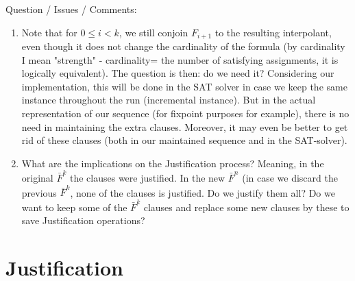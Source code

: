 \documentclass{article}
\begin{document}
Question / Issues / Comments:
\begin{enumerate}
	\item Note that for $0\leq i < k$, we still conjoin $F_{i+1}$ to the resulting interpolant, even though it does not change the cardinality of the formula (by cardinality I mean "strength" - cardinality= the number of satisfying assignments, it is logically equivalent). The question is then: do we need it? Considering our implementation, this will be done in the SAT solver in case we keep the same instance throughout the run (incremental instance). But in the actual representation of our sequence (for fixpoint purposes for example), there is no need in maintaining the extra clauses. Moreover, it may even be better to get rid of these clauses (both in our maintained sequence and in the SAT-solver).

	\item What are the implications on the Justification process? Meaning, in the original $\bar{F}^k$ the clauses were justified. In the new $\bar{F}^n$ (in case we discard the previous $\bar{F}^k$, none of the clauses is justified. Do we justify them all? Do we want to keep some of the $\bar{F}^k$ clauses and replace some new clauses by these to save Justification operations?
\end{enumerate}

\section{Justification}
\end{document}

